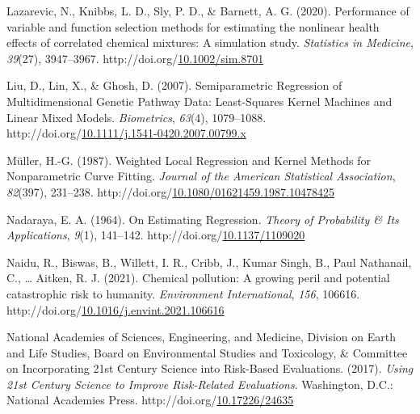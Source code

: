 \documentclass[12pt, twoside]{amherstthesis}
\newenvironment{CSLReferences}[2]%
  {}%
  {\par}
\begin{document}
\begin{CSLReferences}{1}{0}
\leavevmode{}%
Lazarevic, N., Knibbs, L. D., Sly, P. D., \& Barnett, A. G. (2020). Performance of variable and function selection methods for estimating the nonlinear health effects of correlated chemical mixtures: {A} simulation study. \emph{Statistics in Medicine}, \emph{39}(27), 3947--3967. http://doi.org/\href{https://doi.org/10.1002/sim.8701}{10.1002/sim.8701}

\leavevmode{}%
Liu, D., Lin, X., \& Ghosh, D. (2007). Semiparametric {Regression} of {Multidimensional} {Genetic} {Pathway} {Data}: {Least}-{Squares} {Kernel} {Machines} and {Linear} {Mixed} {Models}. \emph{Biometrics}, \emph{63}(4), 1079--1088. http://doi.org/\href{https://doi.org/10.1111/j.1541-0420.2007.00799.x}{10.1111/j.1541-0420.2007.00799.x}

\leavevmode{}%
Müller, H.-G. (1987). Weighted {Local} {Regression} and {Kernel} {Methods} for {Nonparametric} {Curve} {Fitting}. \emph{Journal of the American Statistical Association}, \emph{82}(397), 231--238. http://doi.org/\href{https://doi.org/10.1080/01621459.1987.10478425}{10.1080/01621459.1987.10478425}

\leavevmode{}%
Nadaraya, E. A. (1964). On {Estimating} {Regression}. \emph{Theory of Probability \& Its Applications}, \emph{9}(1), 141--142. http://doi.org/\href{https://doi.org/10.1137/1109020}{10.1137/1109020}

\leavevmode{}%
Naidu, R., Biswas, B., Willett, I. R., Cribb, J., Kumar Singh, B., Paul Nathanail, C., \ldots{} Aitken, R. J. (2021). Chemical pollution: {A} growing peril and potential catastrophic risk to humanity. \emph{Environment International}, \emph{156}, 106616. http://doi.org/\href{https://doi.org/10.1016/j.envint.2021.106616}{10.1016/j.envint.2021.106616}

\leavevmode{}%
National Academies of Sciences, Engineering, and Medicine, Division on Earth and Life Studies, Board on Environmental Studies and Toxicology, \& Committee on Incorporating 21st Century Science into Risk-Based Evaluations. (2017). \emph{Using 21st {Century} {Science} to {Improve} {Risk}-{Related} {Evaluations}}. Washington, D.C.: National Academies Press. http://doi.org/\href{https://doi.org/10.17226/24635}{10.17226/24635}


\end{CSLReferences}
\end{document}
